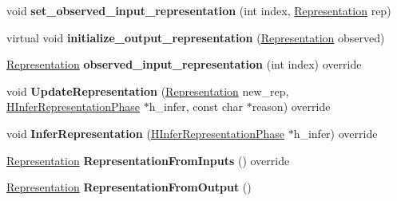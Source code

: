 \begin{DoxyCompactItemize}
\item 
void {\bfseries set\+\_\+observed\+\_\+input\+\_\+representation} (int index, \hyperlink{classv8_1_1internal_1_1_representation}{Representation} rep)\hypertarget{classv8_1_1internal_1_1_h_binary_operation_a62f72952aaa2a8def3eab5bac00912c1}{}\label{classv8_1_1internal_1_1_h_binary_operation_a62f72952aaa2a8def3eab5bac00912c1}

\item 
virtual void {\bfseries initialize\+\_\+output\+\_\+representation} (\hyperlink{classv8_1_1internal_1_1_representation}{Representation} observed)\hypertarget{classv8_1_1internal_1_1_h_binary_operation_a6584822dd034320b1abb7a295d5d76b1}{}\label{classv8_1_1internal_1_1_h_binary_operation_a6584822dd034320b1abb7a295d5d76b1}

\item 
\hyperlink{classv8_1_1internal_1_1_representation}{Representation} {\bfseries observed\+\_\+input\+\_\+representation} (int index) override\hypertarget{classv8_1_1internal_1_1_h_binary_operation_a610b4b43cdfad8f1c4e4f55d680eb009}{}\label{classv8_1_1internal_1_1_h_binary_operation_a610b4b43cdfad8f1c4e4f55d680eb009}

\item 
void {\bfseries Update\+Representation} (\hyperlink{classv8_1_1internal_1_1_representation}{Representation} new\+\_\+rep, \hyperlink{classv8_1_1internal_1_1_h_infer_representation_phase}{H\+Infer\+Representation\+Phase} $\ast$h\+\_\+infer, const char $\ast$reason) override\hypertarget{classv8_1_1internal_1_1_h_binary_operation_acb95f058c8fa72bdcd2255e0a5f9e294}{}\label{classv8_1_1internal_1_1_h_binary_operation_acb95f058c8fa72bdcd2255e0a5f9e294}

\item 
void {\bfseries Infer\+Representation} (\hyperlink{classv8_1_1internal_1_1_h_infer_representation_phase}{H\+Infer\+Representation\+Phase} $\ast$h\+\_\+infer) override\hypertarget{classv8_1_1internal_1_1_h_binary_operation_a23ceb02ff1052f2e2fcdc2866dd02df5}{}\label{classv8_1_1internal_1_1_h_binary_operation_a23ceb02ff1052f2e2fcdc2866dd02df5}

\item 
\hyperlink{classv8_1_1internal_1_1_representation}{Representation} {\bfseries Representation\+From\+Inputs} () override\hypertarget{classv8_1_1internal_1_1_h_binary_operation_a64120a053abff17c89adf24b286ac560}{}\label{classv8_1_1internal_1_1_h_binary_operation_a64120a053abff17c89adf24b286ac560}

\item 
\hyperlink{classv8_1_1internal_1_1_representation}{Representation} {\bfseries Representation\+From\+Output} ()\hypertarget{classv8_1_1internal_1_1_h_binary_operation_aa9a29577fcf2d692c1c4be97e40a7436}{}\label{classv8_1_1internal_1_1_h_binary_operation_aa9a29577fcf2d692c1c4be97e40a7436}


\end{DoxyCompactItemize}
